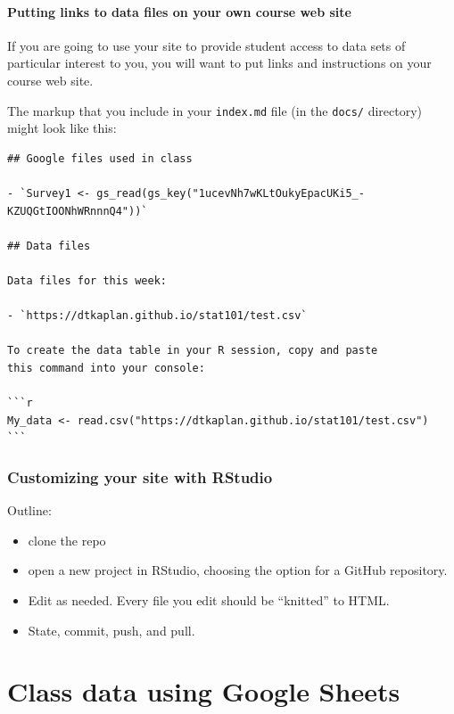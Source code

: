 \documentclass[]{book}
\providecommand{\tightlist}{%
  \setlength{\itemsep}{0pt}\setlength{\parskip}{0pt}}
\theoremstyle{definition}
\theoremstyle{definition}
\theoremstyle{definition}
\theoremstyle{remark}
\begin{document}
\subsubsection{Putting links to data files on your own course web
site}\label{putting-links-to-data-files-on-your-own-course-web-site}

If you are going to use your site to provide student access to data sets
of particular interest to you, you will want to put links and
instructions on your course web site.

The markup that you include in your \texttt{index.md} file (in the
\texttt{docs/} directory) might look like this:

\begin{verbatim}
## Google files used in class

- `Survey1 <- gs_read(gs_key("1ucevNh7wKLtOukyEpacUKi5_-KZUQGtIOONhWRnnnQ4"))`

## Data files

Data files for this week:

- `https://dtkaplan.github.io/stat101/test.csv`

To create the data table in your R session, copy and paste 
this command into your console:

```r
My_data <- read.csv("https://dtkaplan.github.io/stat101/test.csv")
```
\end{verbatim}

\subsection{Customizing your site with
RStudio}\label{customizing-your-site-with-rstudio}

Outline:

\begin{itemize}
\tightlist
\item
  clone the repo
\item
  open a new project in RStudio, choosing the option for a GitHub
  repository.
\item
  Edit as needed. Every file you edit should be ``knitted'' to HTML.
\item
  State, commit, push, and pull.
\end{itemize}

\chapter{Class data using Google
Sheets}\label{class-data-using-google-sheets}
\end{document}
